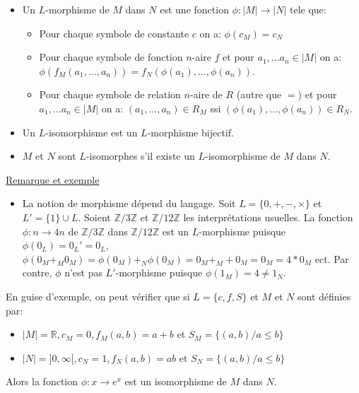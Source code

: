 \documentclass[a4paper, 11pt]{article}
\begin{document}
    \begin{itemize}
        \item Un $L$-morphisme de $M$ dans $N$ est une fonction $\phi: |M| \rightarrow |N|$ tele que:
        \begin{itemize}
            \item Pour chaque symbole de constante $c$ on a: $\phi(c_M) = c_N$
            \item Pour chaque symbole de fonction $n$-aire $f$ et pour $a_1, ... a_n \in |M|$ on a: $\phi(f_M(a_1,...,a_n)) = f_N(\phi(a_1), ..., \phi(a_n))$.
            \item Pour chaque symbole de relation $n$-aire de $R$ (autre que $=$) et pour $a_1, ... a_n \in |M|$ on a: $(a_1, ..., a_n) \in R_M$ ssi $(\phi(a_1), ..., \phi(a_n)) \in R_N$. 
        \end{itemize}
        \item Un $L$-isomorphisme est un $L$-morphisme bijectif.
        \item $M$ et $N$ sont $L$-isomorphes s'il existe un $L$-isomorphisme de $M$ dans $N$.
    \end{itemize}

\newpage
\noindent
\underline{Remarque et exemple}

\begin{itemize}
    \item La notion de morphisme dépend du langage. Soit $L = \{0, +, -, \times\}$ et $L' = \{1\} \cup L$. Soient $\mathbb{Z}/3\mathbb{Z}$ et $\mathbb{Z}/12\mathbb{Z}$ les interprétations usuelles. La fonction $\phi: n \rightarrow 4n$ de $\mathbb{Z}/3\mathbb{Z}$ dans $\mathbb{Z}/12\mathbb{Z}$ est un $L$-morphisme puisque $\phi(0_L) = 0_L' = 0_L$, $\phi(0_M +_M 0_M) = \phi(0_M) +_N \phi(0_M) = 0_M +_M + 0_M = 0_M = 4*0_M$ ect. Par contre, $\phi$ n'est pas $L'$-morphisme puisque $\phi(1_M) = 4 \neq 1_N$.
\end{itemize}

En guise d'exemple, on peut vérifier que si $L = \{c,f,S\}$ et $M$ et $N$ sont définies par:

\begin{itemize}
    \item $|M| = \mathbb{R}, c_M = 0, f_M(a,b) = a + b$ et $S_M = \{(a,b) / a \leq b\}$
    \item $|N| = ]0, \infty [, c_N = 1, f_N(a,b) = ab$ et $S_N = \{(a,b) / a \leq b \}$
\end{itemize}

Alors la fonction $\phi : x \rightarrow e^{x}$ est un isomorphisme de $M$ dans $N$.
\end{document}
